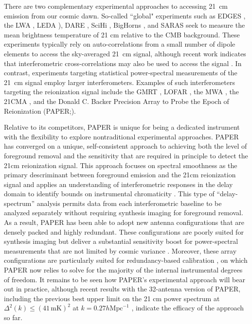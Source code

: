 \documentclass[twocolumn,numberedappendix]{emulateapj} \shorttitle{PSA64}
\begin{document}
There are two complementary experimental approaches to accessing 21~cm emission from
our cosmic dawn.  So-called ``global" experiments such as 
EDGES \citep{bowman_et_al2010}, 
the LWA \citep{ellingson_et_al2013},
LEDA \citep{greenhill_bernardi2012}), 
DARE \citep{burns_et_al2012}, 
SciHi \cite{tabitha_et_al2014}, 
BigHorns \citep{sokolowski_et_al2015},
and SARAS \citep{patra_et_al2015} 
seek to measure the
mean brightness temperature of 21 cm relative to the CMB background. These experiments
typically rely on auto-correlations from a small number of dipole elements to access
the sky-averaged 21~cm signal, although recent work indicates
that interferometric cross-correlations may also be used to access the signal
\citep{presley_et_al2015,vedantham_et_al2015}.
In contrast, experiments targeting statistical power-spectral measurements of the 21~cm
signal employ larger interferometers.  Examples of such interferometers targeting
the reionization signal include
the GMRT \citep{paciga_et_al2013},
LOFAR \citep{van_haarlem_et_al2013},
the MWA \citep{tingay_et_al2013},
the 21CMA \citep{peterson_et_al2004,wu2009},
and the Donald C. Backer Precision Array to Probe the Epoch of Reionization (PAPER;\citealt{parsons_et_al2010}). 

Relative to its competitors, PAPER is unique for being a dedicated instrument with the flexibility
to explore nontraditional experimental approaches.  PAPER has converged on a unique, self-consistent
approach to achieving both the level of foreground removal and the sensitivity that are required in principle
to detect the 21cm reionization signal.  This approach focuses on spectral smoothness as the primary
descriminant between foreground emission and the 21cm reionization signal  and applies an understanding
of interferometric responses in the delay domain to identify bounds on instrumental chromaticity 
\citep{parsons_et_al2012b}.  This type of ``delay-spectrum'' analysis permits data from each 
interferometric baseline
to be analyzed separately without requiring synthesis imaging for foreground removal.  As a result, PAPER has
been able to adopt new antenna configurations that are densely packed and highly redundant.
These configurations are poorly suited for synthesis imaging but
deliver a substantial sensitivity boost for power-spectral measurements that are not limited by
cosmic variance \citep{parsons_et_al2012a}.  Moreover, these array configurations are particularly suited
for redundancy-based calibration \citep{liu_et_al2010,wieringa1992,zheng_et_al2014}, on which PAPER
now relies to solve for the majority of the internal instrumental degrees of freedom.
It remains to be seen how PAPER's experimental approach will bear out in
practice, although recent results with the 32-antenna version of PAPER, including the previous best upper 
limit on the 21 cm power spectrum at $\Delta^2 (k) \leq (41\,\textrm{mK})^{2}$ at 
$k=0.27 h \text{Mpc}^{-1}$ \citep{parsons_et_al2014}, indicate the efficacy of the approach so far.
\end{document}
